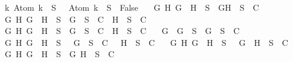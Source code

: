 \begin{isabellebody}
\ \ {\isasymand}\ {\isacharparenleft}{\isasymforall}k{\isachardot}\ Atom\ k\ {\isasymin}\ S\ {\isasymlongrightarrow}\ \isactrlbold {\isasymnot}\ {\isacharparenleft}Atom\ k{\isacharparenright}\ {\isasymin}\ S\ {\isasymlongrightarrow}\ False{\isacharparenright}\isanewline
\ \ {\isasymand}\ {\isacharparenleft}{\isasymforall}G\ H{\isachardot}\ G\ \isactrlbold {\isasymand}\ H\ {\isasymin}\ S\ {\isasymlongrightarrow}\ {\isacharbraceleft}G{\isacharcomma}H{\isacharbraceright}\ {\isasymunion}\ S\ {\isasymin}\ C{\isacharparenright}\isanewline
\ \ {\isasymand}\ {\isacharparenleft}{\isasymforall}G\ H{\isachardot}\ G\ \isactrlbold {\isasymor}\ H\ {\isasymin}\ S\ {\isasymlongrightarrow}\ {\isacharbraceleft}G{\isacharbraceright}\ {\isasymunion}\ S\ {\isasymin}\ C\ {\isasymor}\ {\isacharbraceleft}H{\isacharbraceright}\ {\isasymunion}\ S\ {\isasymin}\ C{\isacharparenright}\isanewline
\ \ {\isasymand}\ {\isacharparenleft}{\isasymforall}G\ H{\isachardot}\ G\ \isactrlbold {\isasymrightarrow}\ H\ {\isasymin}\ S\ {\isasymlongrightarrow}\ {\isacharbraceleft}\isactrlbold {\isasymnot}G{\isacharbraceright}\ {\isasymunion}\ S\ {\isasymin}\ C\ {\isasymor}\ {\isacharbraceleft}H{\isacharbraceright}\ {\isasymunion}\ S\ {\isasymin}\ C{\isacharparenright}\isanewline
\ \ {\isasymand}\ {\isacharparenleft}{\isasymforall}G{\isachardot}\ \isactrlbold {\isasymnot}\ {\isacharparenleft}\isactrlbold {\isasymnot}G{\isacharparenright}\ {\isasymin}\ S\ {\isasymlongrightarrow}\ {\isacharbraceleft}G{\isacharbraceright}\ {\isasymunion}\ S\ {\isasymin}\ C{\isacharparenright}\isanewline
\ \ {\isasymand}\ {\isacharparenleft}{\isasymforall}G\ H{\isachardot}\ \isactrlbold {\isasymnot}{\isacharparenleft}G\ \isactrlbold {\isasymand}\ H{\isacharparenright}\ {\isasymin}\ S\ {\isasymlongrightarrow}\ {\isacharbraceleft}\isactrlbold {\isasymnot}\ G{\isacharbraceright}\ {\isasymunion}\ S\ {\isasymin}\ C\ {\isasymor}\ {\isacharbraceleft}\isactrlbold {\isasymnot}\ H{\isacharbraceright}\ {\isasymunion}\ S\ {\isasymin}\ C{\isacharparenright}\isanewline
\ \ {\isasymand}\ {\isacharparenleft}{\isasymforall}G\ H{\isachardot}\ \isactrlbold {\isasymnot}{\isacharparenleft}G\ \isactrlbold {\isasymor}\ H{\isacharparenright}\ {\isasymin}\ S\ {\isasymlongrightarrow}\ {\isacharbraceleft}\isactrlbold {\isasymnot}\ G{\isacharcomma}\ \isactrlbold {\isasymnot}\ H{\isacharbraceright}\ {\isasymunion}\ S\ {\isasymin}\ C{\isacharparenright}\isanewline
\ \ {\isasymand}\ {\isacharparenleft}{\isasymforall}G\ H{\isachardot}\ \isactrlbold {\isasymnot}{\isacharparenleft}G\ \isactrlbold {\isasymrightarrow}\ H{\isacharparenright}\ {\isasymin}\ S\ {\isasymlongrightarrow}\ {\isacharbraceleft}G{\isacharcomma}\isactrlbold {\isasymnot}\ H{\isacharbraceright}\ {\isasymunion}\ S\ {\isasymin}\ C{\isacharparenright}{\isachardoublequoteclose}\isanewline

\end{isabellebody}
